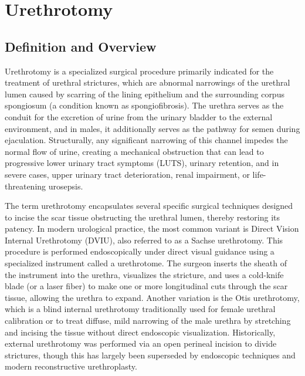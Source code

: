 \chapter{Urethrotomy}

\section*{Definition and Overview}
Urethrotomy is a specialized surgical procedure primarily indicated for the treatment of urethral strictures, which are abnormal narrowings of the urethral lumen caused by scarring of the lining epithelium and the surrounding corpus spongiosum (a condition known as spongiofibrosis). The urethra serves as the conduit for the excretion of urine from the urinary bladder to the external environment, and in males, it additionally serves as the pathway for semen during ejaculation. Structurally, any significant narrowing of this channel impedes the normal flow of urine, creating a mechanical obstruction that can lead to progressive lower urinary tract symptoms (LUTS), urinary retention, and in severe cases, upper urinary tract deterioration, renal impairment, or life-threatening urosepsis.

The term urethrotomy encapsulates several specific surgical techniques designed to incise the scar tissue obstructing the urethral lumen, thereby restoring its patency. In modern urological practice, the most common variant is Direct Vision Internal Urethrotomy (DVIU), also referred to as a Sachse urethrotomy. This procedure is performed endoscopically under direct visual guidance using a specialized instrument called a urethrotome. The surgeon inserts the sheath of the instrument into the urethra, visualizes the stricture, and uses a cold-knife blade (or a laser fiber) to make one or more longitudinal cuts through the scar tissue, allowing the urethra to expand. Another variation is the Otis urethrotomy, which is a blind internal urethrotomy traditionally used for female urethral calibration or to treat diffuse, mild narrowing of the male urethra by stretching and incising the tissue without direct endoscopic visualization. Historically, external urethrotomy was performed via an open perineal incision to divide strictures, though this has largely been superseded by endoscopic techniques and modern reconstructive urethroplasty.

